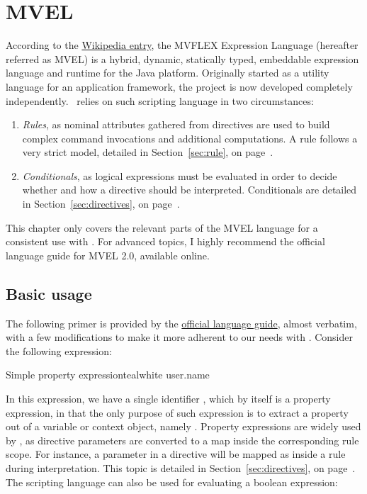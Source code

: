 \chapter{MVEL}
\label{chap:mvel}

According to the \href{https://en.wikipedia.org/wiki/MVEL}{Wikipedia entry}, the MVFLEX Expression Language (hereafter referred as MVEL) is a hybrid, dynamic, statically typed, embeddable expression language and runtime for the Java platform. Originally started as a utility language for an application framework, the project is now developed completely independently. \arara\ relies on such scripting language in two circumstances:

\begin{enumerate}
\item\emph{Rules}, as nominal attributes gathered from directives are used to build complex command invocations and additional computations. A rule follows a very strict model, detailed in Section~\ref{sec:rule}, on page~\pageref{sec:rule}.

\item\emph{Conditionals}, as logical expressions must be evaluated in order to decide whether and how a directive should be interpreted. Conditionals are detailed in Section~\ref{sec:directives}, on page~\pageref{sec:directives}.
\end{enumerate}

This chapter only covers the relevant parts of the MVEL language for a consistent use with \arara. For advanced topics, I highly recommend the official language guide for MVEL 2.0, available online.

\section{Basic usage}
\label{sec:mvelbasicusage}

The following primer is provided by the \href{https://mvel.documentnode.com/}{official language guide}, almost verbatim, with a few modifications to make it more adherent to our needs with \arara. Consider the following expression:

\begin{codebox}{Simple property expression}{teal}{\icnote}{white}
user.name
\end{codebox}

In this expression, we have a single identifier , which by itself is a property expression, in that the only purpose of such expression is to extract a property out of a variable or context object, namely . Property expressions are widely used by \arara, as directive parameters are converted to a map inside the corresponding rule scope. For instance, a parameter  in a directive will be mapped as  inside a rule during interpretation. This topic is detailed in Section~\ref{sec:directives}, on page~\pageref{sec:directives}. The scripting language can also be used for evaluating a boolean expression:

